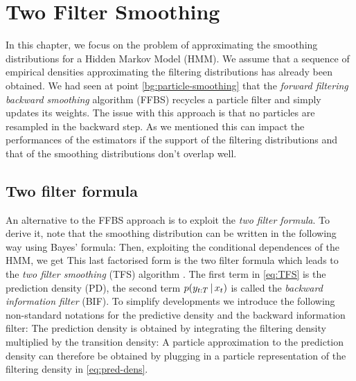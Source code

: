 
\section{Two Filter Smoothing}
In this chapter, we focus on the problem of approximating the smoothing distributions for a Hidden Markov Model (HMM). 
We assume that a sequence of empirical densities approximating the filtering distributions has already been obtained.
We had seen at point \ref{bg:particle-smoothing} that the \emph{forward filtering backward smoothing} algorithm (FFBS) recycles a particle filter and simply updates its weights. 
The issue with this approach is that no particles are resampled in the backward step. As we mentioned this can impact the performances of the estimators if the support of the filtering distributions and that of the smoothing distributions don't overlap well.

\subsection{Two filter formula}
An alternative to the FFBS approach is to exploit the \emph{two filter formula}. 
To derive it, note that the smoothing distribution can be written in the following way using Bayes' formula:
%
% 
Then, exploiting the conditional dependences of the HMM, we get
%
%
This last factorised form is the two filter formula which leads to the \emph{two filter smoothing} (TFS) algorithm \citep{bresler86, kitagawa96}. 
The first term in \eqref{eq:TFS} is the prediction density (PD), 
the second term $p(y_{t:T}\,|\, x_{t})$ is called the \emph{backward information filter} (BIF). To simplify developments we introduce the following non-standard notations for the predictive density and the backward information filter:
%
%
The prediction density is obtained by integrating the filtering density multiplied by the transition density:
%
%
A particle approximation to the prediction density can therefore be obtained by plugging in a particle representation of the filtering density in \eqref{eq:pred-dens}. 
